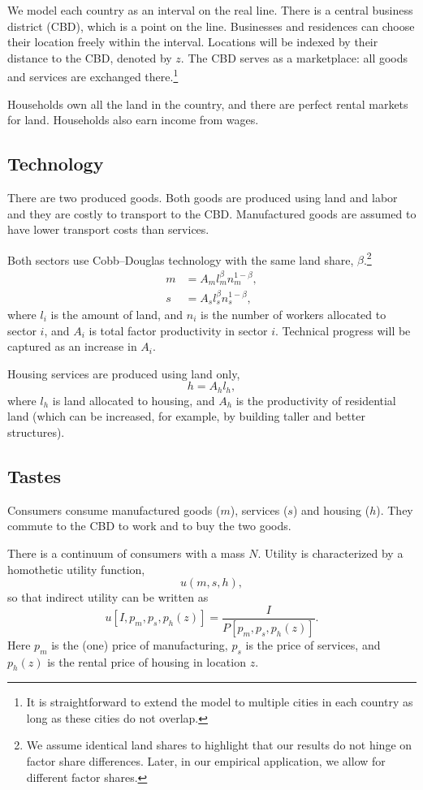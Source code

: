 \documentclass[12pt]{article}
\begin{document}
We model each country as an interval on the real line. There is a central business district (CBD), which is a point on the line. Businesses and residences can choose their location freely within the interval. Locations will be indexed by their distance to the CBD, denoted by $z$. The CBD serves as a marketplace: all goods and services are exchanged there.\footnote{It is straightforward to extend the model to multiple cities in each country as long as these cities do not overlap.}

Households own all the land in the country, and there are perfect rental markets for land. Households also earn income from wages.

\subsection{Technology}
There are two produced goods. Both goods are produced using land and labor and they are costly to transport to the CBD. Manufactured goods are assumed to have lower transport costs than services.

Both sectors use Cobb--Douglas technology with the same land share, $\beta$.\footnote{We assume identical land shares to highlight that our results do not hinge on factor share differences. Later, in our empirical application, we allow for different factor shares.}
\begin{align*}
m&=A_ml_m^\beta n_m^{1-\beta},\\
s&=A_sl_s^\beta n_s^{1-\beta},
\end{align*}
where $l_i$ is the amount of land, and $n_i$ is the number of workers allocated to sector $i$, and $A_i$ is total factor productivity in sector $i$. Technical progress will be captured as an increase in $A_i$.

Housing services are produced using land only,
\[
 h=A_hl_h,
\]
where $l_h$ is land allocated to housing, and $A_h$ is the productivity of residential land (which can be increased, for example, by building taller and better structures).

\subsection{Tastes}
Consumers consume manufactured goods ($m$), services ($s$) and housing ($h$). They commute to the CBD to work and to buy the two goods.

There is a continuum of consumers with a mass $N$. Utility is characterized by a homothetic utility function,
\[
u(m,s,h),
\]
so that indirect utility can be written as
\[
u[I, p_m,p_s,p_h(z)] = \frac{I}{P[p_m,p_s,p_h(z)]}.
\]
Here $p_m$ is the (one) price of manufacturing, $p_s$ is the price of services, and $p_h(z)$ is the rental price of housing in location $z$.
\end{document}
